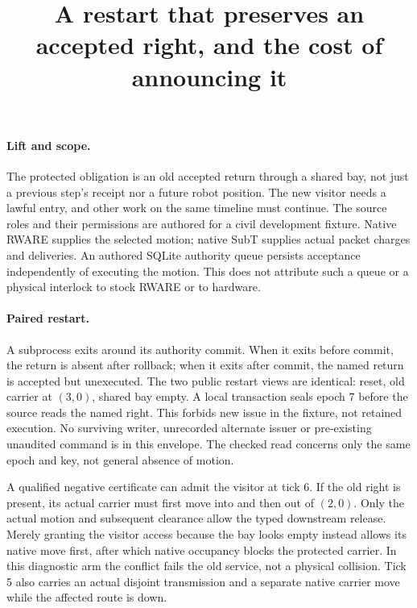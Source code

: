 \documentclass[11pt]{article}
\title{A restart that preserves an accepted right, and the cost of announcing it}
\author{}\date{}
\begin{document}
\maketitle

\paragraph{Lift and scope.}
The protected obligation is an old accepted return through a shared bay,
not just a previous step's receipt nor a future robot position. The
new visitor needs a lawful entry, and other work on the same timeline
must continue. The source roles and their permissions are authored for
a civil development fixture. Native RWARE supplies the selected motion;
native SubT supplies actual packet charges and deliveries. An authored
SQLite authority queue persists acceptance independently of executing the
motion. This does not attribute such a queue or a physical interlock to
stock RWARE or to hardware.

\paragraph{Paired restart.}
A subprocess exits around its authority commit. When it exits before
commit, the return is absent after rollback; when it exits after commit,
the named return is accepted but unexecuted. The two public restart
views are identical: reset, old carrier at \((3,0)\), shared bay empty.
A local transaction seals epoch 7 before the source reads the named
right. This forbids new issue in the fixture, not retained execution.
No surviving writer, unrecorded alternate issuer or pre-existing
unaudited command is in this envelope. The checked read concerns only
the same epoch and key, not general absence of motion.

A qualified negative certificate can admit the visitor at tick 6.
If the old right is present, its actual carrier must first move into
and then out of \((2,0)\). Only the actual motion and subsequent
clearance allow the typed downstream release. Merely granting the
visitor access because the bay looks empty instead allows its native
move first, after which native occupancy blocks the protected carrier.
In this diagnostic arm the conflict fails the old service, not a
physical collision. Tick 5 also carries an actual disjoint transmission
and a separate native carrier move while the affected route is down.
\end{document}
